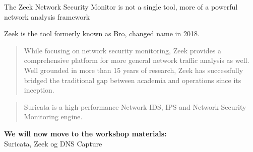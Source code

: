 \documentclass[Screen16to9,17pt]{foils}
\begin{document}

The Zeek Network Security Monitor is not a single tool, more of a
powerful network analysis framework

Zeek is the tool formerly known as Bro, changed name in 2018. 




\begin{quote}
While focusing on network security monitoring, Zeek provides a comprehensive platform for more general network traffic analysis as well. Well grounded in more than 15 years of research, Zeek has successfully bridged the traditional gap between academia and operations since its inception.
\end{quote}




\begin{quote}
Suricata is a high performance Network IDS, IPS and Network Security Monitoring engine.
\end{quote}


{\bf We will now move to the workshop materials:}\\
Suricata, Zeek og DNS Capture\\
{\small{}}



\slidenext
\end{document}
